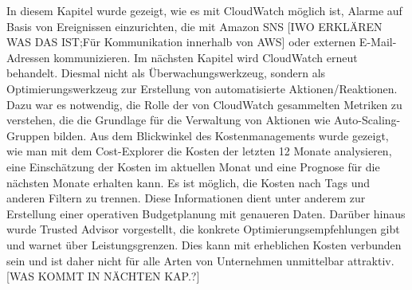 In diesem Kapitel wurde gezeigt, wie es mit CloudWatch möglich ist, Alarme auf Basis von Ereignissen einzurichten, die mit Amazon SNS [IWO ERKLÄREN WAS DAS IST;Für Kommunikation innerhalb von AWS] oder externen E-Mail-Adressen kommunizieren. Im nächsten Kapitel wird CloudWatch erneut behandelt. Diesmal nicht als Überwachungswerkzeug, sondern als Optimierungswerkzeug zur Erstellung von automatisierte Aktionen/Reaktionen. Dazu war es notwendig, die Rolle der von CloudWatch gesammelten Metriken zu verstehen, die die Grundlage für die Verwaltung von Aktionen wie Auto-Scaling-Gruppen bilden. 
Aus dem Blickwinkel des Kostenmanagements wurde gezeigt, wie man mit dem Cost-Explorer die Kosten der letzten 12 Monate analysieren, eine Einschätzung der Kosten im aktuellen Monat und eine Prognose für die nächsten Monate erhalten kann. Es ist möglich, die Kosten nach Tags und anderen Filtern zu trennen. Diese Informationen dient unter anderem zur Erstellung einer operativen Budgetplanung mit genaueren Daten.
Darüber hinaus wurde Trusted Advisor vorgestellt, die konkrete Optimierungsempfehlungen gibt und warnet über Leistungsgrenzen. Dies kann mit erheblichen Kosten verbunden sein und ist daher nicht für alle Arten von Unternehmen unmittelbar attraktiv. 
[WAS KOMMT IN NÄCHTEN KAP.?]

